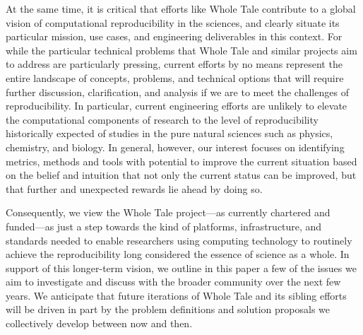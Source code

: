 At the same time, it is critical that efforts like Whole Tale contribute to a global
	vision of computational reproducibility in the sciences, and clearly situate
	its particular mission, use cases, and engineering deliverables in this context.
For while the particular technical problems that Whole Tale and similar projects
	aim to address are particularly pressing, current efforts by no means
	represent the entire landscape of concepts, problems, and technical options
	that will require further discussion, clarification, and analysis if we are to meet
	the challenges of reproducibility.
In particular, current engineering efforts are unlikely to elevate the computational components
	of research to the level of reproducibility historically expected of studies in the
	pure natural sciences such as physics, chemistry, and biology. In general, however, our
    interest focuses on identifying metrics, methods and tools with potential to improve the
    current situation based on the belief and intuition that not only the current status can
    be improved, but that further and unexpected rewards lie ahead by doing so.

Consequently, we view the Whole Tale project---as currently chartered and funded---as just a step
	towards the kind of platforms, infrastructure, and standards
	needed to enable researchers using computing technology to routinely
	achieve the reproducibility long considered the essence of science as a whole.
In support of this longer-term vision, we outline in this paper %
 a few of the issues	we aim to investigate and discuss with the broader community over the next few years.
We anticipate that future iterations of Whole Tale and its sibling efforts
	will be driven in part by the problem definitions and solution proposals we collectively
	develop between now and then.





